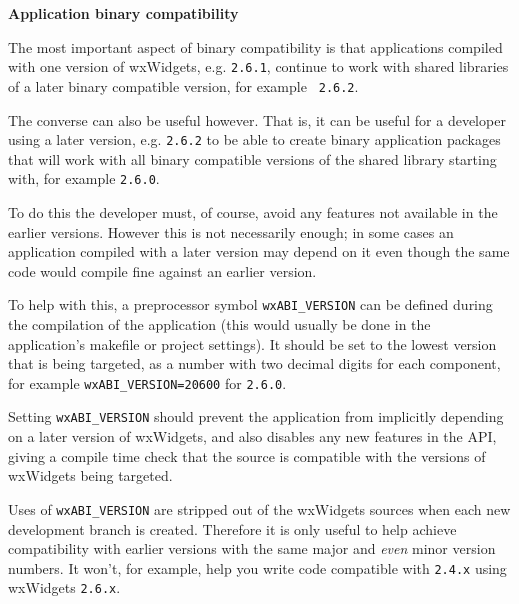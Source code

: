 {\large {\bf Application binary compatibility}}\label{appbincompatibility}

The most important aspect of binary compatibility is that applications
compiled with one version of wxWidgets, e.g. {\tt 2.6.1}, continue to work
with shared libraries of a later binary compatible version, for example {\tt
2.6.2}.

The converse can also be useful however. That is, it can be useful for a
developer using a later version, e.g. {\tt 2.6.2} to be able to create binary
application packages that will work with all binary compatible versions of
the shared library starting with, for example {\tt 2.6.0}.

To do this the developer must, of course, avoid any features not available
in the earlier versions. However this is not necessarily enough; in some
cases an application compiled with a later version may depend on it even
though the same code would compile fine against an earlier version.

To help with this, a preprocessor symbol {\tt wxABI\_VERSION} can be defined
during the compilation of the application (this would usually be done in the
application's makefile or project settings). It should be set to the lowest
version that is being targeted, as a number with two decimal digits for each
component, for example {\tt wxABI\_VERSION=20600} for {\tt 2.6.0}.

Setting {\tt wxABI\_VERSION} should prevent the application from implicitly
depending on a later version of wxWidgets, and also disables any new features
in the API, giving a compile time check that the source is compatible with
the versions of wxWidgets being targeted.

Uses of {\tt wxABI\_VERSION} are stripped out of the wxWidgets sources when
each new development branch is created. Therefore it is only useful to help
achieve compatibility with earlier versions with the same major
and {\em even} minor version numbers. It won't, for example, help you write
code compatible with {\tt 2.4.x} using wxWidgets {\tt 2.6.x}.
